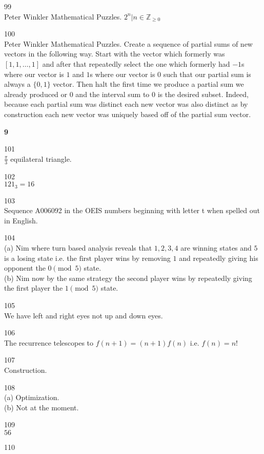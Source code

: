 99 \\
Peter Winkler Mathematical Puzzles. $\boxed{2^n|n\in \mathbb{Z}_{\ge 0}}$

100 \\
Peter Winkler Mathematical Puzzles. Create a sequence of partial sums of new vectors in the following way. Start with the vector which formerly was $[1,1,\dots,1]$ and after that repeatedly select the one which formerly had $-1$s where our vector is $1$ and $1$s where our vector is $0$ such that our partial sum is always a $\{0,1 \}$ vector. Then halt the first time we produce a partial sum we already produced or $0$ and the interval sum to $0$ is the desired subset. Indeed, because each partial sum was distinct each new vector was also distinct as by construction each new vector was uniquely based off of the partial sum vector.

\newpage

\textbf{9}

101 \\
$\boxed{\frac{\pi}{3}}$ equilateral triangle.

102 \\
$\boxed{121}_3=16$

103 \\
Sequence A006092 in the OEIS numbers beginning with letter t when spelled out in English.

104 \\
(a) Nim where turn based analysis reveals that $1,2,3,4$ are winning states and $5$ is a losing state i.e. the $\boxed{\text{first}}$ player wins by removing $1$ and repeatedly giving his opponent the $0 \pmod{5}$ state. \\
(b) Nim now by the same strategy the $\boxed{\text{second}}$ player wins by repeatedly giving the first player the $1 \pmod{5}$ state.

105 \\
We have left and right eyes not up and down eyes.

106 \\
The recurrence telescopes to $f(n+1)=(n+1)f(n)$ i.e. $\boxed{f(n)=n!}$

107 \\
Construction.

108 \\
(a) Optimization. \\
(b) Not at the moment.

109 \\
$\boxed{56}$

110 \\



